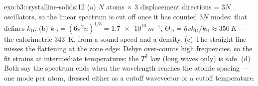 \begin{solution}{exo:b3:crystalline-solids:12}
(a) $N$ atoms $\times$ 3 displacement directions = $3N$
oscillators, so the linear spectrum is cut off once it has
counted $3N$ modes: that defines $k_{\text{D}}$. (b)
$k_{\text{D}} = (6\pi^2n)^{1/3} = \qty{1.7e10}{m^{-1}}$,
$\Theta_{\text{D}} = \hbar vk_{\text{D}}/k_{\text{B}} \approx
\qty{350}{K}$ --- the calorimetric \qty{343}{K}, from a sound
speed and a density. (c) The straight line misses the flattening
at the zone edge: Debye over-counts high frequencies, so the fit
strains at intermediate temperatures; the $T^3$ law (long waves
only) is safe. (d) Both say the spectrum ends when the wavelength
reaches the atomic spacing --- one mode per atom, dressed either
as a cutoff wavevector or a cutoff temperature.
\end{solution}

